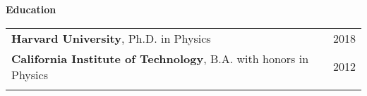 \documentclass[letterpaper,11pt,oneside]{article}
\newcommand{\crimson}[1]{\textcolor[rgb]{0.67, 0.11, 0.188}{#1}}
\begin{document}
 \vspace{0.1cm}
\raggedright
\normalsize
\begin{flushleft}
 \textbf{\Large{\crimson{E}ducation}} \sout{\hfill} \\
\vspace{0.5cm}
\begin{tabular}{@{} l l }
     \textbf{Harvard University}, Ph.D. in Physics & 2018\\
     \textbf{California Institute of Technology}, B.A. with honors in  Physics & 2012 \\
     \hspace{0.8\linewidth} & \hspace{0.2\linewidth} \\
\end{tabular}
\end{flushleft}




\clearpage
\end{document}
